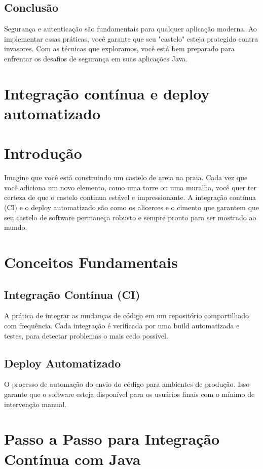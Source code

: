 \documentclass[a4paper,12pt]{book}
\begin{document}
\subsection{Conclusão}
Segurança e autenticação são fundamentais para qualquer aplicação moderna. Ao implementar essas práticas, você garante que seu "castelo" esteja protegido contra invasores. Com as técnicas que exploramos, você está bem preparado para enfrentar os desafios de segurança em suas aplicações Java.


\section{Integração contínua e deploy automatizado}
\section{Introdução}
Imagine que você está construindo um castelo de areia na praia. Cada vez que você adiciona um novo elemento, como uma torre ou uma muralha, você quer ter certeza de que o castelo continua estável e impressionante. A integração contínua (CI) e o deploy automatizado são como os alicerces e o cimento que garantem que seu castelo de software permaneça robusto e sempre pronto para ser mostrado ao mundo.

\section{Conceitos Fundamentais}
\subsection{Integração Contínua (CI)}
A prática de integrar as mudanças de código em um repositório compartilhado com frequência. Cada integração é verificada por uma build automatizada e testes, para detectar problemas o mais cedo possível.

\subsection{Deploy Automatizado}
O processo de automação do envio do código para ambientes de produção. Isso garante que o software esteja disponível para os usuários finais com o mínimo de intervenção manual.

\section{Passo a Passo para Integração Contínua com Java}
\end{document}
